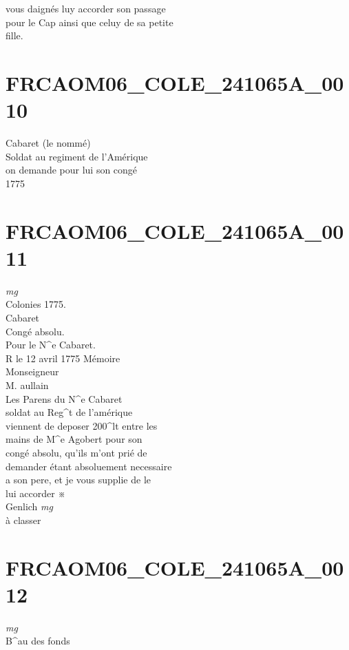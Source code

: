 \documentclass{article}
\begin{document}
\begin{pages}
vous daignés luy accorder son passage\\
pour le Cap ainsi que celuy de sa petite\\
fille.
\pend
\endnumbering\beginnumbering\section{FRCAOM06\_COLE\_241065A\_0010}\pstart
Cabaret (le nommé)\\
Soldat au regiment de l'Amérique\\
on demande pour lui son congé\\
1775
\pend
\endnumbering\beginnumbering\section{FRCAOM06\_COLE\_241065A\_0011}
\vspace{0.5cm}\noindent
\textit{mg}
\footnotesize \\
Colonies 1775.\\
Cabaret\\
Congé absolu.\\
Pour le N\^{}e Cabaret.\\
R le 12 avril 1775
\normalsize \pstart
Mémoire\\
Monseigneur\\
M. aullain\\
Les Parens du N\^{}e Cabaret\\
soldat au Reg\^{}t de l'amérique\\
viennent de deposer 200\^{}lt entre les\\
mains de M\^{}e Agobert pour son\\
congé absolu, qu'ils m'ont prié de\\
demander étant absoluement necessaire\\
a son pere, et je vous supplie de le\\
lui accorder ※\\
Genlich
\pend
\vspace{0.5cm}\noindent
\textit{mg}
\footnotesize \\
à classer
\normalsize 
\endnumbering\beginnumbering\section{FRCAOM06\_COLE\_241065A\_0012}
\vspace{0.5cm}\noindent
\textit{mg}
\footnotesize \\
B\^{}au des fonds\\

\end{pages}
\end{document}
